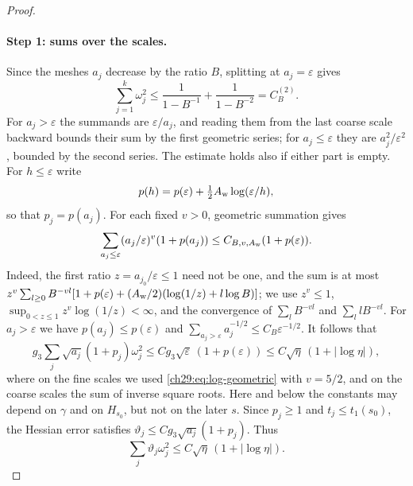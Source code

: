 \begin{proof}
\paragraph{Step 1: sums over the scales.}
Since the meshes $a_j$ decrease by the ratio $B$, splitting at $a_j=\varepsilon$ gives
\begin{equation}\label{ch29:eq:row-square-sum}
 \sum_{j=1}^k\omega_j^2\le\frac1{1-B^{-1}}+\frac1{1-B^{-2}}=C_B^{(2)}.
\end{equation}
For $a_j>\varepsilon$ the summands are $\varepsilon/a_j$, and reading them from the last coarse scale backward bounds their sum by the first geometric series; for $a_j\le\varepsilon$ they are $a_j^2/\varepsilon^2$, bounded by the second series. The estimate holds also if either part is empty. For $h\le\varepsilon$ write
\[
 p(h)=p(\varepsilon)+\tfrac12A_{\rm w}\log(\varepsilon/h),
\]
so that $p_j=p(a_j)$. For each fixed $v>0$, geometric summation gives
\begin{equation}\label{ch29:eq:log-geometric}
 \sum_{a_j\le\varepsilon}(a_j/\varepsilon)^v(1+p(a_j))\le C_{B,v,A_{\rm w}}(1+p(\varepsilon)).
\end{equation}
Indeed, the first ratio $z=a_{j_0}/\varepsilon\le1$ need not be one, and the sum is at most $z^v\sum_{l\ge0}B^{-vl}[1+p(\varepsilon)+(A_{\rm w}/2)(\log(1/z)+l\log B)]$; we use $z^v\le1$, $\sup_{0<z\le1}z^v\log(1/z)<\infty$, and the convergence of $\sum_lB^{-vl}$ and $\sum_llB^{-vl}$. For $a_j>\varepsilon$ we have $p(a_j)\le p(\varepsilon)$ and $\sum_{a_j>\varepsilon}a_j^{-1/2}\le C_B\varepsilon^{-1/2}$. It follows that
\begin{equation}\label{ch29:eq:small-variation-sum}
 g_3\sum_j\sqrt{a_j}(1+p_j)\omega_j^2\le Cg_3\sqrt\varepsilon\,(1+p(\varepsilon))\le C\sqrt\eta\,(1+|\log\eta|),
\end{equation}
where on the fine scales we used \eqref{ch29:eq:log-geometric} with $v=5/2$, and on the coarse scales the sum of inverse square roots. Here and below the constants may depend on $\gamma$ and on $H_{s_0}$, but not on the later $s$. Since $p_j\ge1$ and $t_j\le t_1(s_0)$, the Hessian error satisfies $\vartheta_j\le Cg_3\sqrt{a_j}(1+p_j)$. Thus
\begin{equation}\label{ch29:eq:main-stein-sum}
 \sum_j\vartheta_j\omega_j^2\le C\sqrt\eta\,(1+|\log\eta|).
\end{equation}


\end{proof}
